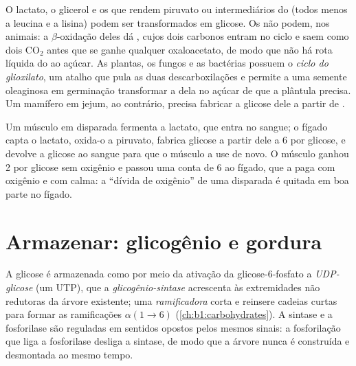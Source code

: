 \begin{proposition}\label{prop:b1:biosyntheses-integration:cannot}
O lactato, o glicerol e os  que rendem piruvato ou
intermediários do  (todos menos a leucina e a lisina)
podem ser transformados em glicose. Os  não podem, nos
animais: a $\beta$-oxidação deles dá , cujos dois carbonos
entram no ciclo e saem como dois $\mathrm{CO_2}$ antes que se ganhe
qualquer oxaloacetato, de modo que não há rota líquida do  ao
açúcar. As plantas, os fungos e as bactérias possuem o
\emph{ciclo do glioxilato}, um atalho que pula as duas descarboxilações
e permite a uma semente oleaginosa em germinação transformar a 
dela no açúcar de que a plântula precisa. Um mamífero em jejum, ao
contrário, precisa fabricar a glicose dele a partir de .
\end{proposition}

\begin{example}\label{ex:b1:biosyntheses-integration:cori}
Um músculo em disparada fermenta  a lactato, que entra no
sangue; o fígado capta o lactato, oxida-o a piruvato, fabrica glicose a
partir dele a 6  por glicose, e devolve a glicose ao sangue para que
o músculo a use de novo. O músculo ganhou 2  por glicose sem oxigênio
e passou uma conta de 6 ao fígado, que a paga com oxigênio e com calma:
a ``dívida de oxigênio'' de uma disparada é quitada em boa parte no
fígado.
\end{example}

\section{Armazenar: glicogênio e gordura}

\begin{definition}\label{def:b1:biosyntheses-integration:glycogensynthesis}
A glicose é armazenada como  por meio da ativação da
glicose-6-fosfato a \emph{UDP-glicose} (um UTP), que a
\emph{glicogênio-sintase} acrescenta às extremidades não redutoras da
árvore existente; uma \emph{ ramificadora} corta e reinsere
cadeias curtas para formar as ramificações $\alpha(1{\to}6)$
(\cref{ch:b1:carbohydrates}). A sintase e a fosforilase são reguladas em
sentidos opostos pelos mesmos sinais: a fosforilação que liga a
fosforilase desliga a sintase, de modo que a árvore nunca é construída e
desmontada ao mesmo tempo.
\end{definition}

